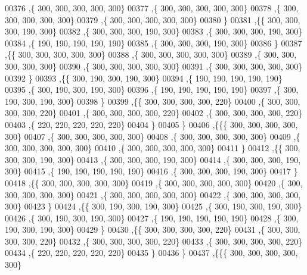 \begin{DoxyCode}
00376    ,\{   300,   300,   300,   300,   300\}
00377    ,\{   300,   300,   300,   300,   300\}
00378    ,\{   300,   300,   300,   300,   300\}
00379    ,\{   300,   300,   300,   300,   300\}
00380    \}
00381   ,\{\{   300,   300,   300,   190,   300\}
00382    ,\{   300,   300,   300,   190,   300\}
00383    ,\{   300,   300,   300,   190,   300\}
00384    ,\{   190,   190,   190,   190,   190\}
00385    ,\{   300,   300,   300,   190,   300\}
00386    \}
00387   ,\{\{   300,   300,   300,   300,   300\}
00388    ,\{   300,   300,   300,   300,   300\}
00389    ,\{   300,   300,   300,   300,   300\}
00390    ,\{   300,   300,   300,   300,   300\}
00391    ,\{   300,   300,   300,   300,   300\}
00392    \}
00393   ,\{\{   300,   190,   300,   190,   300\}
00394    ,\{   190,   190,   190,   190,   190\}
00395    ,\{   300,   190,   300,   190,   300\}
00396    ,\{   190,   190,   190,   190,   190\}
00397    ,\{   300,   190,   300,   190,   300\}
00398    \}
00399   ,\{\{   300,   300,   300,   300,   220\}
00400    ,\{   300,   300,   300,   300,   220\}
00401    ,\{   300,   300,   300,   300,   220\}
00402    ,\{   300,   300,   300,   300,   220\}
00403    ,\{   220,   220,   220,   220,   220\}
00404    \}
00405   \}
00406  ,\{\{\{   300,   300,   300,   300,   300\}
00407    ,\{   300,   300,   300,   300,   300\}
00408    ,\{   300,   300,   300,   300,   300\}
00409    ,\{   300,   300,   300,   300,   300\}
00410    ,\{   300,   300,   300,   300,   300\}
00411    \}
00412   ,\{\{   300,   300,   300,   190,   300\}
00413    ,\{   300,   300,   300,   190,   300\}
00414    ,\{   300,   300,   300,   190,   300\}
00415    ,\{   190,   190,   190,   190,   190\}
00416    ,\{   300,   300,   300,   190,   300\}
00417    \}
00418   ,\{\{   300,   300,   300,   300,   300\}
00419    ,\{   300,   300,   300,   300,   300\}
00420    ,\{   300,   300,   300,   300,   300\}
00421    ,\{   300,   300,   300,   300,   300\}
00422    ,\{   300,   300,   300,   300,   300\}
00423    \}
00424   ,\{\{   300,   190,   300,   190,   300\}
00425    ,\{   300,   190,   300,   190,   300\}
00426    ,\{   300,   190,   300,   190,   300\}
00427    ,\{   190,   190,   190,   190,   190\}
00428    ,\{   300,   190,   300,   190,   300\}
00429    \}
00430   ,\{\{   300,   300,   300,   300,   220\}
00431    ,\{   300,   300,   300,   300,   220\}
00432    ,\{   300,   300,   300,   300,   220\}
00433    ,\{   300,   300,   300,   300,   220\}
00434    ,\{   220,   220,   220,   220,   220\}
00435    \}
00436   \}
00437  ,\{\{\{   300,   300,   300,   300,   300\}

\end{DoxyCode}
